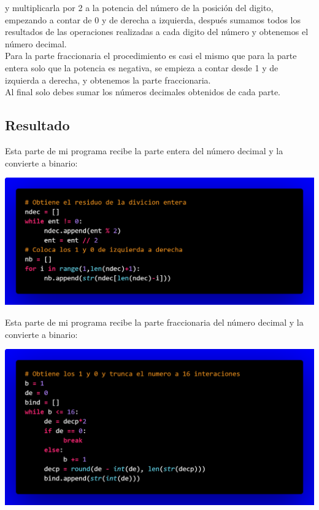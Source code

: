 \documentclass[12pt]{article}
\begin{document}
\begin{itemize}
					 y multiplicarla por 2 a la potencia del número de la posición del digito, empezando a contar de 0 y 
					 de derecha a izquierda, después sumamos todos los resultados de las operaciones realizadas a cada 
					 digito del número y obtenemos el número decimal.\\
					 Para la parte fraccionaria el procedimiento es casi el mismo que para la parte entera solo que la 
					 potencia es negativa, se empieza a contar desde 1 y de izquierda a derecha, y obtenemos la parte 
					 fraccionaria.\\
					 Al final solo debes sumar los números decimales obtenidos de cada parte.
			\end{itemize}

			\newpage

		\begin{center}
			\section*{Resultado}\label{sec:Resultado}
		\end{center}
			Esta parte de mi programa recibe la parte entera del número decimal y la convierte a binario:
			\begin{center}
				\includegraphics[width=\linewidth]{Base 10 a Base 2.png} 				
			\end{center}
			Esta parte de mi programa recibe la parte fraccionaria del número decimal y la convierte a binario:
			\begin{center}
				\includegraphics[width=\linewidth]{Basef 10 a Basef 2.png} 				
			\end{center}
\end{document}
